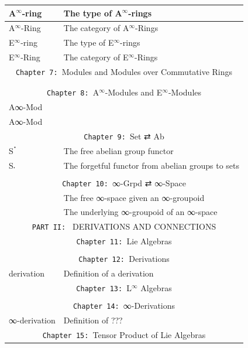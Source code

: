 \documentclass{book}
\theoremstyle{definition}
\begin{document}
{\begin{longtable}{|| l || l ||}
\hline \hline
A${}^{\infty}$-ring & The type of A${}^{\infty}$-rings \\
\hline
A${}^{\infty}$-Ring & The category of A${}^{\infty}$-Rings \\
 \hline
E${}^{\infty}$-ring  & The type of E${}^{\infty}$-rings \\
 \hline
E${}^{\infty}$-Ring  & The category of E${}^{\infty}$-Rings \\
 \hline \hline
\multicolumn{2}{||c||}{\texttt{Chapter 7: }Modules and Modules over Commutative Rings} \\
\hline \hline
 &  \\
 \hline
 &  \\
 \hline \hline
\multicolumn{2}{||c||}{\texttt{Chapter 8: }A${}^{\infty}$-Modules and E${}^{\infty}$-Modules} \\
\hline \hline
A∞-Mod &  \\
\hline
A∞-Mod &  \\
 \hline \hline
 \multicolumn{2}{||c||}{\texttt{Chapter 9: }Set ⇄ Ab} \\
\hline \hline
Sॱ & The free abelian group functor \\
 \hline
S𛲔 & The forgetful functor from abelian groups to sets \\
 \hline
 &  \\
\hline \hline
 \multicolumn{2}{||c||}{\texttt{Chapter 10: }∞-Grpd ⇄ ∞-Space} \\
\hline \hline
 & The free ∞-space given an ∞-groupoid \\
\hline
 & The underlying ∞-groupoid of an ∞-space \\
\hline \hline
\multicolumn{2}{||c||}{\texttt{PART II: } DERIVATIONS AND CONNECTIONS} \\
\hline \hline
\multicolumn{2}{||c||}{\texttt{Chapter 11: }Lie Algebras} \\
\hline \hline
 &  \\
\hline \hline
\multicolumn{2}{||c||}{\texttt{Chapter 12: }Derivations} \\
\hline \hline
derivation & Definition of a derivation \\
\hline
\hline \hline
\multicolumn{2}{||c||}{\texttt{Chapter 13: }L${}^{\infty}$ Algebras} \\
\hline \hline
 &  \\
\hline \hline
\multicolumn{2}{||c||}{\texttt{Chapter 14: }∞-Derivations} \\
\hline \hline
∞-derivation & Definition of ??? \\
\hline \hline
\multicolumn{2}{||c||}{\texttt{Chapter 15: }Tensor Product of Lie Algebras} \\

\end{longtable}}
\end{document}

